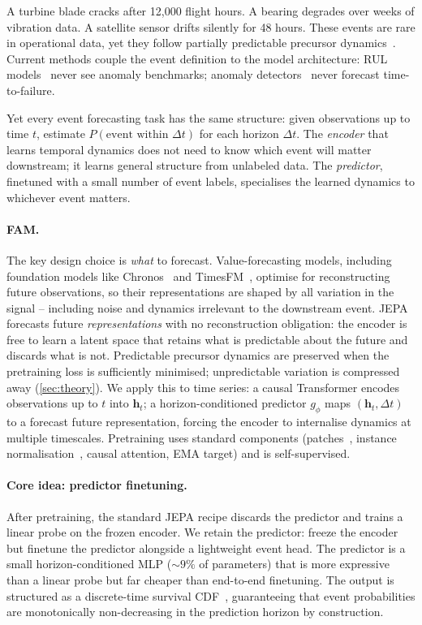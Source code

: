 \documentclass{article}
\newcommand{\h}{\mathbf{h}}
\newcommand{\predictor}{g_\phi}
\begin{document}
A turbine blade cracks after 12{,}000 flight hours. A bearing degrades over weeks of vibration data. A satellite sensor drifts silently for 48 hours. These events are rare in operational data, yet they follow partially predictable precursor dynamics~\citep{taleb2007blackswan,scheffer2009earlywarning}. Current methods couple the event definition to the model architecture: RUL models~\citep{fan2024star} never see anomaly benchmarks; anomaly detectors~\citep{xu2022anomalytransformer,mtsjepa2026} never forecast time-to-failure.

Yet every event forecasting task has the same structure: given observations up to time $t$, estimate $P(\text{event within } \Delta t)$ for each horizon $\Delta t$. The \emph{encoder} that learns temporal dynamics does not need to know which event will matter downstream; it learns general structure from unlabeled data. The \emph{predictor}, finetuned with a small number of event labels, specialises the learned dynamics to whichever event matters.

\paragraph{FAM.} The key design choice is \emph{what} to forecast. Value-forecasting models, including foundation models like Chronos~\citep{ansari2024chronos} and TimesFM~\citep{das2024timesfm}, optimise for reconstructing future observations, so their representations are shaped by all variation in the signal -- including noise and dynamics irrelevant to the downstream event. JEPA~\citep{assran2023ijepa} forecasts future \emph{representations} with no reconstruction obligation: the encoder is free to learn a latent space that retains what is predictable about the future and discards what is not. Predictable precursor dynamics are preserved when the pretraining loss is sufficiently minimised; unpredictable variation is compressed away (\cref{sec:theory}). We apply this to time series: a causal Transformer encodes observations up to $t$ into $\h_t$; a horizon-conditioned predictor $\predictor$ maps $(\h_t, \Delta t)$ to a forecast future representation, forcing the encoder to internalise dynamics at multiple timescales. Pretraining uses standard components (patches~\citep{nie2023patchtst}, instance normalisation~\citep{kim2022revin}, causal attention, EMA target) and is self-supervised.

\paragraph{Core idea: predictor finetuning.} After pretraining, the standard JEPA recipe discards the predictor and trains a linear probe on the frozen encoder. We retain the predictor: freeze the encoder but finetune the predictor alongside a lightweight event head. The predictor is a small horizon-conditioned MLP (${\sim}9\%$ of parameters) that is more expressive than a linear probe but far cheaper than end-to-end finetuning. The output is structured as a discrete-time survival CDF~\citep{lee2018deephit,gensheimer2019nnetsurvival}, guaranteeing that event probabilities are monotonically non-decreasing in the prediction horizon by construction.
\end{document}
